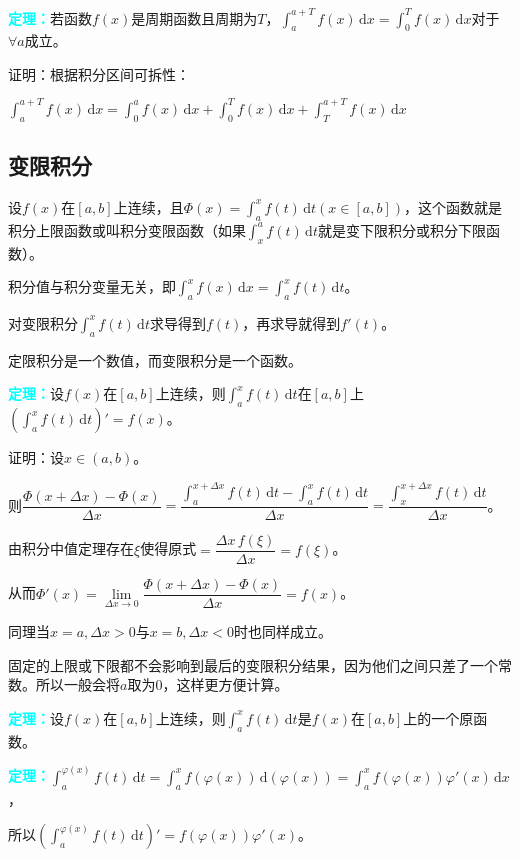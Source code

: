 \documentclass[UTF8, 12pt]{ctexart}
\begin{document}
\textcolor{aqua}{\textbf{定理：}}若函数$f(x)$是周期函数且周期为$T$，$\int_a^{a+T}f(x)\,\textrm{d}x=\int_0^Tf(x)\,\textrm{d}x$对于$\forall a$成立。

证明：根据积分区间可拆性：

$\int_a^{a+T}f(x)\,\textrm{d}x=\int_0^af(x)\,\textrm{d}x+\int_0^Tf(x)\,\textrm{d}x+\int_T^{a+T}f(x)\,\textrm{d}x$

\subsection{变限积分}

设$f(x)$在$[a,b]$上连续，且$\Phi(x)=\int_a^xf(t)\,\textrm{d}t(x\in[a,b])$，这个函数就是积分上限函数或叫积分变限函数（如果$\int_x^af(t)\,\textrm{d}t$就是变下限积分或积分下限函数）。

积分值与积分变量无关，即$\int_a^xf(x)\,\textrm{d}x=\int_a^xf(t)\,\textrm{d}t$。

对变限积分$\int_{a}^xf(t)\,\textrm{d}t$求导得到$f(t)$，再求导就得到$f'(t)$。

定限积分是一个数值，而变限积分是一个函数。

\textcolor{aqua}{\textbf{定理：}}设$f(x)$在$[a,b]$上连续，则$\int_a^xf(t)\,\textrm{d}t$在$[a,b]$上$(\int_a^xf(t)\,\textrm{d}t)'=f(x)$。

证明：设$x\in(a,b)$。

则$\dfrac{\Phi(x+\Delta x)-\Phi(x)}{\Delta x}=\dfrac{\int_a^{x+\Delta x}f(t)\,\textrm{d}t-\int_a^xf(t)\,\textrm{d}t}{\Delta x}=\dfrac{\int_x^{x+\Delta x}f(t)\,\textrm{d}t}{\Delta x}$。

由积分中值定理存在$\xi$使得原式$=\dfrac{\Delta x\,f(\xi)}{\Delta x}=f(\xi)$。

从而$\Phi'(x)=\lim\limits_{\Delta x\to 0}\dfrac{\Phi(x+\Delta x)-\Phi(x)}{\Delta x}=f(x)$。

同理当$x=a,\Delta x>0$与$x=b,\Delta x<0$时也同样成立。

固定的上限或下限都不会影响到最后的变限积分结果，因为他们之间只差了一个常数。所以一般会将$a$取为0，这样更方便计算。

\textcolor{aqua}{\textbf{定理：}}设$f(x)$在$[a,b]$上连续，则$\int_a^xf(t)\,\textrm{d}t$是$f(x)$在$[a,b]$上的一个原函数。

\textcolor{aqua}{\textbf{定理：}}$\int_a^{\varphi(x)}f(t)\,\textrm{d}t=\int_a^xf(\varphi(x))\,\textrm{d}(\varphi(x))=\int_a^xf(\varphi(x))\varphi'(x)\,\textrm{d}x$，

所以$(\int_a^{\varphi(x)}f(t)\,\textrm{d}t)'=f(\varphi(x))\varphi'(x)$。
\end{document}
